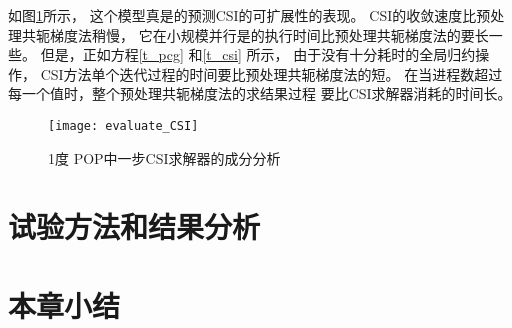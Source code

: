 如图\ref{fig:cst_ratio}所示， 这个模型真是的预测CSI的可扩展性的表现。 
CSI的收敛速度比预处理共轭梯度法稍慢， 它在小规模并行是的执行时间比预处理共轭梯度法的要长一些。 
但是，正如方程\ref{t_pcg} 和\ref{t_csi} 所示， 由于没有十分耗时的全局归约操作， CSI方法单个迭代过程的时间要比预处理共轭梯度法的短。 
在当进程数超过每一个值时，整个预处理共轭梯度法的求结果过程 要比CSI求解器消耗的时间长。 

 
\begin {figure}%
\vspace{-20pt}
\centering
\texttt{[image: evaluate\_CSI]}
\vspace{-10pt}
\caption[] { 1度 POP中一步CSI求解器的成分分析}
\label{fig:cst_ratio}
\vspace{-10pt}
\end{figure}

\section{试验方法和结果分析}
\label{sec:verifyExp}

\section{本章小结}
\label{sec:verifyConclusion}




